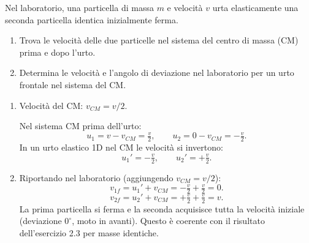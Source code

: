 
\begin{question}[ID=2.5, subtitle={Urto elastico tra particelle identiche nel centro di massa}, tags={urti elastici, laboratorio di riferimento}, difficulty=difficile]
Nel laboratorio, una particella di massa \(m\) e velocità \(v\) urta elasticamente una seconda particella identica inizialmente ferma.
\begin{enumerate}
    \item Trova le velocità delle due particelle nel sistema del centro di massa (CM) prima e dopo l'urto.
    \item Determina le velocità e l'angolo di deviazione nel laboratorio per un urto frontale nel sistema del CM.
\end{enumerate}
\begin{solution}
    \begin{enumerate}
        \item Velocità del CM: \(v_{CM} = v/2\).

        Nel sistema CM prima dell'urto:
        \[
            u_1 = v - v_{CM} = \tfrac{v}{2}, \qquad u_2 = 0 - v_{CM} = -\tfrac{v}{2}.
        \]
        In un urto elastico 1D nel CM le velocità si invertono:
        \[
            u_1' = -\tfrac{v}{2}, \qquad u_2' = +\tfrac{v}{2}.
        \]
        \item Riportando nel laboratorio (aggiungendo \(v_{CM} = v/2\)):
        \[
            v_{1f} = u_1' + v_{CM} = -\tfrac{v}{2} + \tfrac{v}{2} = 0.
        \]
        \[
            v_{2f} = u_2' + v_{CM} = +\tfrac{v}{2} + \tfrac{v}{2} = v.
        \]
        La prima particella si ferma e la seconda acquisisce tutta la velocità iniziale (deviazione \(0^\circ\), moto in avanti). Questo è coerente con il risultato dell'esercizio 2.3 per masse identiche.
    \end{enumerate}
\end{solution}
\end{question}


